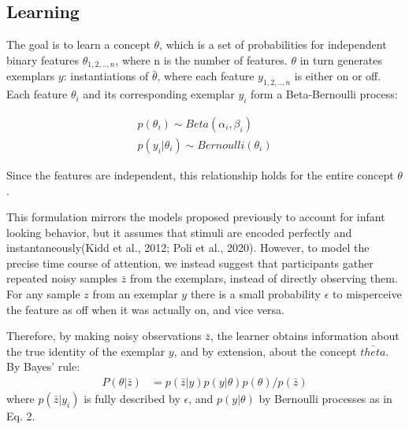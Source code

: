 \documentclass[10pt, letterpaper]{article}
\begin{document}
\hypertarget{learning}{%
\subsection{Learning}\label{learning}}

The goal is to learn a concept \(\theta\), which is a set of
probabilities for independent binary features \(\theta_{1,2,..,n}\),
where n is the number of features. \(\theta\) in turn generates
exemplars \(y\): instantiations of \(\bar{\theta}\), where each feature
\(y_{1,2,..,n}\) is either on or off. Each feature \(\theta_i\) and its
corresponding exemplar \(y_i\) form a Beta-Bernoulli process:

\begin{eqnarray}
p(\theta_i) \sim Beta(\alpha_i,\beta_i) \\
p(y_i|\theta_i) \sim Bernoulli(\theta_i)
\end{eqnarray}

Since the features are independent, this relationship holds for the
entire concept \(\theta\).

This formulation mirrors the models proposed previously to account for
infant looking behavior, but it assumes that stimuli are encoded
perfectly and instantaneously(Kidd et al., 2012; Poli et al., 2020).
However, to model the precise time course of attention, we instead
suggest that participants gather repeated noisy samples \(\bar{z}\) from
the exemplars, instead of directly observing them. For any sample \(z\)
from an exemplar \(y\) there is a small probability \(\epsilon\) to
misperceive the feature as off when it was actually on, and vice versa.

Therefore, by making noisy observations \(\bar{z}\), the learner obtains
information about the true identity of the exemplar \(y\), and by
extension, about the concept \(\bar{theta}\). By Bayes' rule:
\begin{eqnarray}
P(\theta|\bar{z}) &= p(\bar{z}|y) p(y|\theta) p(\theta) / p(\bar{z})
\end{eqnarray} where \(p(\bar{z}|y_i)\) is fully described by
\(\epsilon\), and \(p(y|\theta)\) by Bernoulli processes as in Eq. 2.
\end{document}
